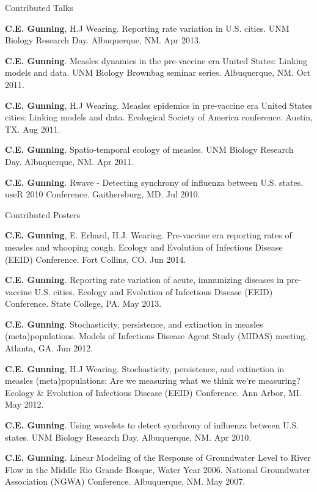 \documentclass{resume} %
\begin{document}
\begin{rSection}{Contributed Talks}
\item {\bf C.E. Gunning}, H.J Wearing.  Reporting rate variation in U.S. cities.
UNM Biology Research Day. Albuquerque, NM. Apr 2013.
\item {\bf C.E. Gunning}.  Measles dynamics in the pre-vaccine era United States: Linking
models and data. UNM Biology Brownbag seminar series. Albuquerque, NM. Oct 2011.
\item {\bf C.E. Gunning}, H.J Wearing.  Measles epidemics in pre-vaccine era United States cities: Linking models and data. Ecological Society of America conference. Austin, TX. Aug 2011.
\item {\bf C.E. Gunning}.  Spatio-temporal ecology of measles. 
UNM Biology Research Day. Albuquerque, NM. Apr 2011.
\item {\bf C.E. Gunning}. Rwave - Detecting synchrony of influenza between U.S. states.
useR 2010 Conference. Gaithersburg, MD. Jul 2010.
\end{rSection}

\begin{rSection}{Contributed Posters}
\item {\bf C.E. Gunning}, E. Erhard, H.J. Wearing.  Pre-vaccine era reporting
rates of measles and whooping cough. Ecology and Evolution of Infectious Disease
(EEID) Conference. Fort Collins, CO. Jun 2014. 
\item {\bf C.E. Gunning}. Reporting rate variation of acute, immunizing diseases in
pre-vaccine U.S. cities. Ecology and Evolution of Infectious Disease
(EEID) Conference. State College, PA. May 2013. 
\item {\bf C.E. Gunning}. Stochasticity, persistence, and extinction in measles
(meta)populations. Models of Infectious Disease Agent Study
(MIDAS) meeting. Atlanta, GA. Jun 2012. 
\item {\bf C.E. Gunning}, H.J Wearing. Stochasticity, persistence, and extinction in measles
(meta)populations: Are we measuring what we think we're
measuring? Ecology \& Evolution of Infectious Disease (EEID) Conference. Ann Arbor, MI. May 2012.
\item {\bf C.E. Gunning}. Using wavelets to detect synchrony of influenza between U.S.
states. UNM Biology Research Day. Albuquerque, NM.  Apr 2010. 
\item {\bf C.E. Gunning}. Linear Modeling of the Response of Groundwater Level to River Flow
in the Middle Rio Grande Bosque, Water Year 2006. National
Groundwater Association (NGWA) Conference. Albuquerque, NM. May 2007. 
\end{rSection}
\end{document}

